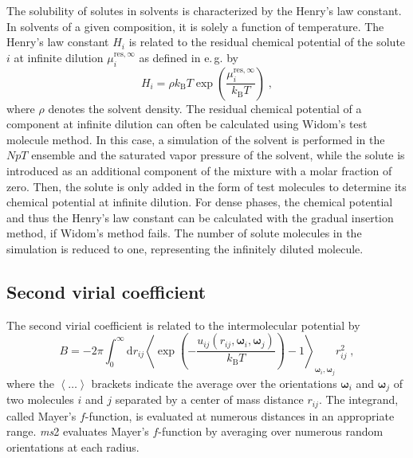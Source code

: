 The solubility of solutes in solvents is characterized by the Henry's law constant. In solvents of a given composition, it is solely a function of temperature. The Henry's law constant $H_{i}$ is related to the residual chemical potential of the solute $i$ at infinite dilution ${\mu}^{\mathrm{res},\infty}_{i}$ as defined in e.\,g. \parencite{shing} by
\begin{equation}
H_{i} = \rho k_{\text{B}}T \exp \left(\frac{{\mu}^{\mathrm{res},\infty}_{i}}{k_{\text{B}}T}\right) \;,
\label{eq:henryslawconstant}
\end{equation}
where $\rho$ denotes the solvent density. The residual chemical potential of a component at infinite dilution can often be calculated using Widom's test molecule method. In this case, a simulation of the solvent is performed in the $NpT$ ensemble and the saturated vapor pressure of the solvent, while the solute is introduced as an additional component of the mixture with a molar fraction of zero. Then, the solute is only added in the form of test molecules to determine its chemical potential at infinite dilution. For dense phases, the chemical potential and thus the Henry's law constant can be calculated with the gradual insertion method, if Widom's method fails. The number of solute molecules in the simulation is reduced to one, representing the infinitely diluted molecule.

\subsection{Second virial coefficient}
\label{sec:second virial coefficient}
 
The second virial coefficient is related to the intermolecular potential by \parencite{gray}
\begin{equation}
B = -2\pi \int^{\infty}_{0} \mathrm dr_{ij} \left\langle \exp \left(-\frac{u_{ij}\left(r_{ij},\bm{\omega}_{i},\bm{\omega}_{j}\right)}{k_{\text{B}}T}\right)-1\right\rangle_{\bm{\omega}_{i},\bm{\omega}_{j}} r^{2}_{ij} \;,
\label{eq:secondvirial}
\end{equation}
where the $\left\langle \ldots \right\rangle$ brackets indicate the average over the orientations $\bm{\omega}_{i}$ and $\bm{\omega}_{j}$ of two molecules $i$ and $j$ separated by a center of mass distance $r_{ij}$. The integrand, called Mayer's $f$-function, is evaluated at numerous distances in an appropriate range. \textit{ms}2 evaluates Mayer's $f$-function by averaging over numerous random orientations at each radius.

